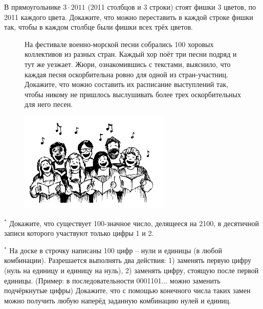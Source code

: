 \begin{prf}
В прямоугольнике $3 \cdot 2011$ (2011 столбцов и 3 строки) стоят фишки 3 цветов, по 2011 каждого цвета. Докажите, что можно переставить в каждой строке фишки так, чтобы в каждом столбце были фишки всех трёх цветов.
\end{prf}

{\setlength{\intextsep}{2pt}
\begin{figure}[h]
\begin{minipage}{0.65\linewidth}\setlength{\parindent}{1.5em}
\begin{thm}
На фестивале военно-морской песни собрались 100 хоровых коллективов из разных стран. Каждый хор поёт три песни подряд и тут же уезжает. Жюри, ознакомившись с текстами, выяснило, что каждая песня оскорбительна ровно для одной из стран-участниц. Докажите, что можно составить их расписание выступлений так, чтобы никому не пришлось выслушивать более трех оскорбительных для него песен.
\end{thm}
\end{minipage}
\hfill
\begin{minipage}{0.30\linewidth}
    \includegraphics[width=0.95\columnwidth]{img/hor.png}
\end{minipage}
\end{figure}}

\begin{thm}$^{\ast}$
Докажите, что существует 100-значное число, делящееся на 2100, в десятичной записи которого участвуют только цифры 1 и 2.
\end{thm}

\begin{thm}$^{\ast}$
На доске в строчку написаны 100 цифр – нули и единицы (в любой комбинации). Разрешается выполнять два действия: 1) заменять первую цифру (нуль на единицу и единицу на нуль), 2) заменять цифру, стоящую после первой единицы. (Пример: в последовательности 0001101... можно заменить подчёркнутые цифры) Докажите, что с помощью конечного числа таких замен можно получить любую наперёд заданную комбинацию нулей и единиц. 
\end{thm}

